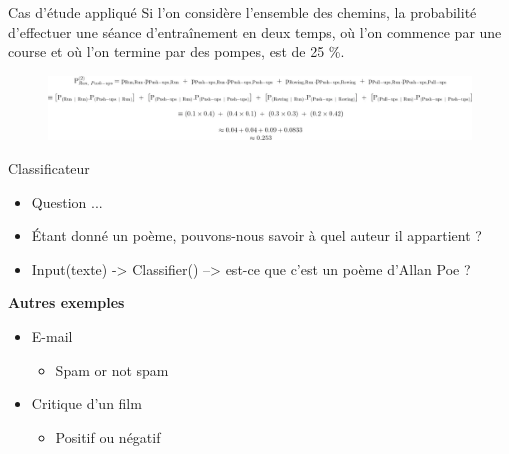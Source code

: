 \documentclass[aspectratio=169,xcolor=dvipsnames, t]{beamer}
\begin{document}
\begin{frame}{Cas d'étude appliqué}
	Si l'on considère l'ensemble des chemins, la probabilité d'effectuer une séance d'entraînement en deux temps, où l'on commence par une course et où l'on termine par des pompes, est de 25 \%.
	
	\begin{figure}
		\includegraphics[height=0.25\paperheight]{figures/equiationiGeneral.png}
	\end{figure}
	
\end{frame}





\begin{frame}{Classificateur}
	\begin{itemize}
		\item Question ... 
		\item Étant donné un poème, pouvons-nous savoir à quel auteur il appartient ?
		\item Input(texte) -> Classifier() --> est-ce que c'est un poème d'Allan Poe ?
	\end{itemize}

	\vspace{0.5cm}
	
	\textbf{Autres exemples}	
	\begin{itemize}
		\item E-mail
		\begin{itemize}
			\item Spam or not spam
		\end{itemize}
		\item Critique d'un film
		\begin{itemize}
			\item Positif ou négatif 
		\end{itemize}
	\end{itemize}
	
\end{frame}
\end{document}
